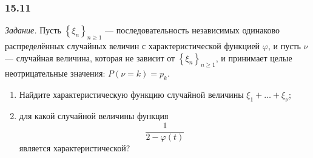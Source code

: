 \subsubsection*{15.11}

\textit{Задание.}
Пусть $ \left\{ \xi_n \right\}_{n \geq 1}$ --- последовательность независимых одинаково распределённых случайных величин с характеристической функцией $ \varphi $,
и пусть $ \nu $ --- случайная величина, которая не зависит от $ \left\{ \xi_n \right\}_{n \geq 1}$,
и принимает целые неотрицательные значения: $P \left( \nu = k \right) = p_k$.
\begin{enumerate}[label=\alph*)]
\item Найдите характеристическую функцию случайной величины $ \xi_1 + \dotsc + \xi_{ \nu }$;
\item для какой случайной величины функция
$$ \frac{1}{2 - \varphi \left( t \right) }$$
является характеристической?
\end{enumerate}


